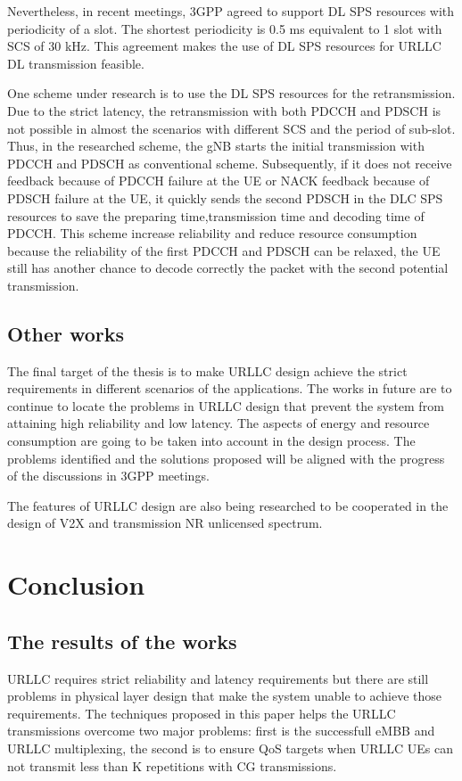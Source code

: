 \documentclass{report}
\begin{document}
Nevertheless, in recent meetings, 3GPP agreed to support DL SPS resources with periodicity of a slot. The shortest periodicity is 0.5 ms equivalent to 1 slot with SCS of 30 kHz. This agreement makes the use of DL SPS resources for URLLC DL transmission feasible. 

One scheme under research is to use the DL SPS resources for the retransmission. Due to the strict latency, the retransmission with both PDCCH and PDSCH is not possible in almost the scenarios with different SCS and the period of sub-slot. Thus, in the researched scheme, the gNB starts the initial transmission with PDCCH and PDSCH as conventional scheme. Subsequently, if it does not receive feedback because of PDCCH failure at the UE or NACK feedback because of PDSCH failure at the UE, it quickly sends the second PDSCH in the DLC SPS resources to save the preparing time,transmission time and decoding time of PDCCH. This scheme increase reliability and reduce resource consumption because the reliability of the first PDCCH and PDSCH can be relaxed, the UE still has another chance to decode correctly the packet with the second potential transmission.

\section{Other works}

The final target of the thesis is to make URLLC design achieve the strict requirements in different scenarios of the applications. The works in future are to continue to locate the problems in URLLC design that prevent the system from attaining high reliability and low latency. The aspects of energy and resource consumption are going to be taken into account in the design process. The problems identified and the solutions proposed will be aligned with the progress of the discussions in 3GPP meetings. 

The features of URLLC design are also being researched to be cooperated in the design of V2X and transmission NR unlicensed spectrum.

\chapter{Conclusion} \label{S5}

\section{The results of the works}
URLLC requires strict reliability and latency requirements but there are still problems in physical layer design that make the system unable to achieve those requirements. The techniques proposed in this paper helps the URLLC transmissions overcome two major problems: first is the successfull eMBB and URLLC multiplexing, the second is to ensure QoS targets when URLLC UEs can not transmit less than K repetitions with CG transmissions. 
\end{document}
